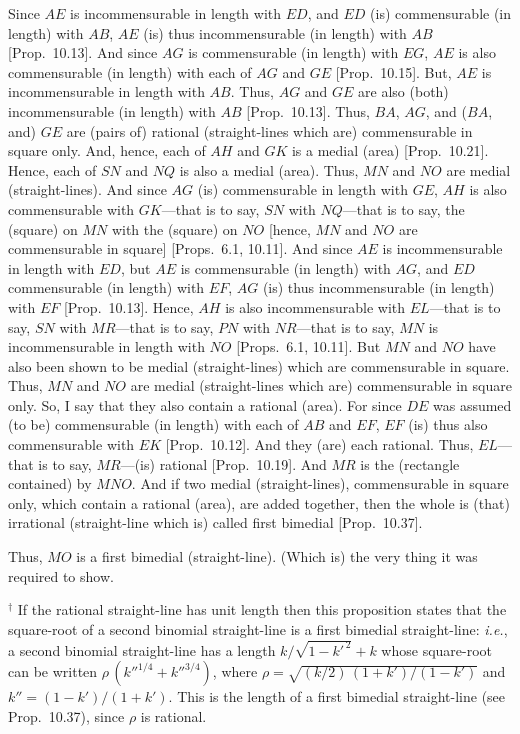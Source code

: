 \begin{Parallel}{}{}
{Since $AE$
is incommensurable in length with $ED$, and $ED$ (is) commensurable 
 (in length) with $AB$, $AE$ (is) thus incommensurable (in length) with $AB$ [Prop.~10.13]. And since $AG$
is commensurable (in length) with $EG$, $AE$ is also commensurable
(in length) with each of $AG$ and $GE$ [Prop.~10.15]. 
But, $AE$ is incommensurable in length with $AB$.  Thus, $AG$ and $GE$
are also (both) 
incommensurable (in length) with $AB$ [Prop.~10.13]. 
Thus, $BA$, $AG$,  and ($BA$, and) $GE$ are (pairs of) rational (straight-lines which are)
commensurable in square only. And, hence, each of $AH$ and $GK$ is a medial
(area) [Prop.~10.21]. Hence, each of $SN$ and $NQ$
is also a medial (area). Thus, $MN$ and $NO$ are medial (straight-lines). 
And since $AG$ (is) commensurable in length with $GE$, $AH$
is also commensurable with $GK$---that is to say, $SN$ with $NQ$---that is to say, the (square)
on $MN$  with the (square) on $NO$ [hence, $MN$ and $NO$
are commensurable in square] [Props.~6.1, 10.11]. And since $AE$ is incommensurable
in length with $ED$, but $AE$ is commensurable (in length) with $AG$,
and $ED$ commensurable (in length) with $EF$, $AG$ (is) thus
incommensurable (in length) with $EF$ [Prop.~10.13]. Hence, $AH$ is also incommensurable with $EL$---that is to say, $SN$ with $MR$---that is to
say, $PN$ with $NR$---that is to say, $MN$ is incommensurable
in length with $NO$  [Props.~6.1, 10.11]. But $MN$ and $NO$ have also
been shown to be medial (straight-lines) which are commensurable in square. 
Thus, $MN$ and $NO$ are medial (straight-lines which are) commensurable
in square only.
So,
I say that they also contain a rational (area). For since $DE$ was assumed
(to be) commensurable (in length) with each of $AB$ and $EF$, $EF$
(is) thus also commensurable with $EK$ [Prop.~10.12]. And they (are) each rational.
Thus, $EL$---that is to say, $MR$---(is) rational [Prop.~10.19]. And $MR$ is the (rectangle contained) by $MNO$. And if two medial (straight-lines), commensurable
in square only, which contain a rational (area), are added together, then the
whole is (that) irrational (straight-line which is)
called first bimedial [Prop.~10.37].

Thus, $MO$ is a first bimedial (straight-line). (Which is) the very thing it
was required to show.}
\end{Parallel}
{\footnotesize\noindent$^\dag$ If the rational straight-line has unit length then this proposition states that the square-root of 
a second binomial straight-line is a first bimedial straight-line: {\em i.e.}, 
a second binomial straight-line has a length $k/\sqrt{1-k'^{\,2}}+k$ whose
square-root can be written $\rho\,(k''^{1/4}+k''^{3/4})$, where $\rho=\sqrt{(k/2)\,(1+k')/(1-k')}$ and $k''=(1-k')/(1+k')$. This is the length of a first bimedial straight-line (see Prop.~10.37), since $\rho$ is rational.}

